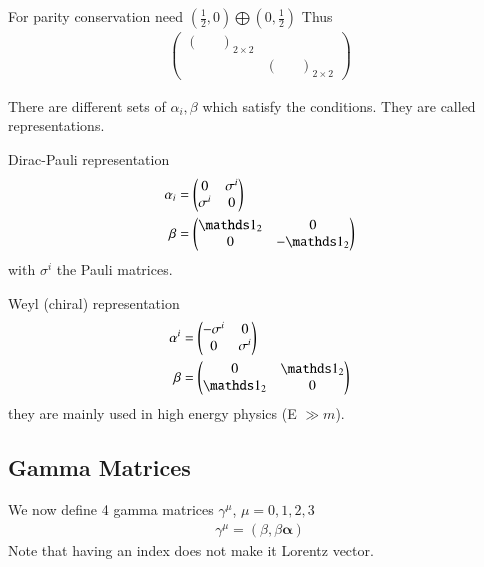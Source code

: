 For parity conservation need $(\frac{1}{2}, 0) \bigoplus (0, \frac{1}{2})$
Thus 
\begin{align*}
   \begin{pmatrix} \begin{pmatrix} & \\ & \end{pmatrix}_{2\times2} & \\ & \begin{pmatrix} & \\ &  \end{pmatrix}_{2\times2}   \end{pmatrix}
\end{align*}

There are different sets of $\alpha_i, \beta$ which satisfy the conditions. They are called representations.

Dirac-Pauli representation
\begin{align}
   \alpha_i &= \begin{pmatrix} 0 & \sigma^i \\ \sigma^i &  0 \end{pmatrix} \\
   \beta &= \begin{pmatrix} \id_2 & 0 \\ 0 & -\id_2\end{pmatrix}
\end{align}
with $\sigma^i$ the Pauli matrices.

Weyl (chiral) representation
\begin{align}
   \alpha^i &= \begin{pmatrix} -\sigma^i & 0 \\ 0 & \sigma^i \end{pmatrix}  \\
   \beta &= \begin{pmatrix} 0 & \id_2 \\ \id_2 & 0 \end{pmatrix}
\end{align}
they are mainly used in high energy physics (E $\gg m$).

\subsection{Gamma Matrices}
We now define 4 gamma matrices $\gamma^\mu$, $\mu=0,1,2,3$
\begin{align}
   \gamma^\mu = \left(\beta, \beta \pmb{\alpha} \right)
\end{align}
Note that having an index does not make it Lorentz vector.

